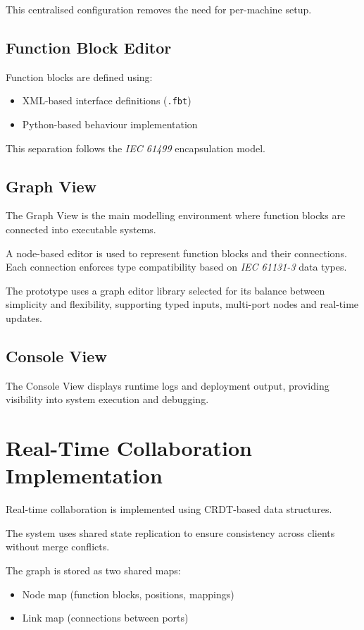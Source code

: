 This centralised configuration removes the need for per-machine setup.

\subsection{Function Block Editor}

Function blocks are defined using:
\begin{itemize}
    \item XML-based interface definitions (\texttt{.fbt})
    \item Python-based behaviour implementation
\end{itemize}

This separation follows the \textit{IEC 61499} encapsulation model.

\subsection{Graph View}

The Graph View is the main modelling environment where function blocks are connected into executable systems.

A node-based editor is used to represent function blocks and their connections. Each connection enforces type compatibility based on \textit{IEC 61131-3} data types.

The prototype uses a graph editor library selected for its balance between simplicity and flexibility, supporting typed inputs, multi-port nodes and real-time updates.

\subsection{Console View}

The Console View displays runtime logs and deployment output, providing visibility into system execution and debugging.

\section{Real-Time Collaboration Implementation}

Real-time collaboration is implemented using \ac{CRDT}-based data structures.

The system uses shared state replication to ensure consistency across clients without merge conflicts.

The graph is stored as two shared maps:
\begin{itemize}
    \item Node map (function blocks, positions, mappings)
    \item Link map (connections between ports)
\end{itemize}

